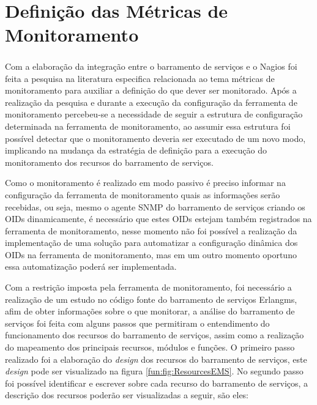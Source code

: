 {%

\section{Definição das Métricas de Monitoramento}
\label{metricas_monitoramento}

Com a elaboração da integração entre o barramento de serviços e o Nagios\textsuperscript{\textregistered} foi feita a pesquisa na literatura especifica relacionada ao tema métricas de monitoramento para auxiliar a definição do que dever ser monitorado. Após a realização da pesquisa e durante a execução da configuração da ferramenta de monitoramento percebeu-se a necessidade de seguir a estrutura de configuração determinada na ferramenta de monitoramento, ao assumir essa estrutura foi possível detectar que o monitoramento deveria ser executado de um novo modo, implicando na mudança da estratégia de definição para a execução do monitoramento dos recursos do barramento de serviços. 

Como o monitoramento é realizado em modo passivo é preciso informar na configuração da ferramenta de monitoramento quais as informações serão recebidas, ou seja, mesmo o agente \acrshort{SNMP} do barramento de serviços criando os \acrshort{OID}s dinamicamente, é necessário que estes \acrshort{OID}s estejam também registrados na ferramenta de monitoramento, nesse momento  não foi possível a realização da implementação de uma solução para automatizar a configuração dinâmica dos \acrshort{OID}s na ferramenta de monitoramento, mas em um outro momento oportuno essa automatização poderá ser implementada.

Com a restrição imposta pela ferramenta de monitoramento, foi necessário a realização de um estudo no código fonte do barramento de serviços Erlangms, afim de obter informações sobre o que monitorar, a análise do barramento de serviços foi feita com alguns passos que permitiram o entendimento do funcionamento dos recursos do barramento de serviços, assim como a realização do mapeamento dos principais recursos, módulos e funções. O primeiro passo realizado foi a elaboração do \textit{design} dos recursos do barramento de serviços, este \textit{design} pode ser visualizado na figura \ref{fun:fig:ResourcesEMS}. No segundo passo foi possível identificar e escrever sobre cada recurso do barramento de serviços, a descrição dos recursos poderão ser visualizadas a seguir, são eles:

}
